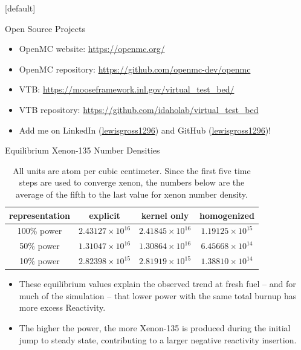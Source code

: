 \documentclass[9pt,t,aspectratio=169]{beamer}
\makeatletter
\newenvironment{withoutheadline}{
       \setbeamertemplate{headline}[default]
       \def\beamer@entrycode{\vspace*{-\headheight}}
    }{}
\makeatother
\begin{document}
\begin{withoutheadline}
    \LARGE
    \begin{frame}{Open Source Projects}
        \begin{itemize}
            \item OpenMC website: \href{https://openmc.org/}{https://openmc.org/}
            \item OpenMC repository: \href{https://github.com/openmc-dev/openmc}{https://github.com/openmc-dev/openmc}
            \item VTB: \href{https://mooseframework.inl.gov/virtual_test_bed/}{https://mooseframework.inl.gov/virtual\_test\_bed/}
            \item VTB repository: \href{https://github.com/idaholab/virtual_test_bed}{https://github.com/idaholab/virtual\_test\_bed}
            \item Add me on LinkedIn (\href{https://www.linkedin.com/in/lewisgross1296}{lewisgross1296}) and GitHub (\href{https://github.com/lewisgross1296}{lewisgross1296})!
        \end{itemize}
    \end{frame}
\end{withoutheadline}

\appendix

\begin{frame}{Equilibrium Xenon-135 Number Densities}
    \LARGE
    \begin{table}
        \centering
        \caption{All units are atom per cubic centimeter. Since the first five time steps are used to converge xenon, the numbers below are the average of the fifth to the last value for xenon number density.}
        \begin{tabular}{|c|c|c|c|} \hline
        representation & explicit & kernel only & homogenized \\ \hline
        100\% power & $2.43127\times 10^{16}$ & $2.41845\times 10^{16}$ & $1.19125\times 10^{15}$ \\  \hline
        50\% power & $1.31047\times 10^{16}$ & $1.30864\times 10^{16}$ & $6.45668\times 10^{14}$ \\ \hline
        10\% power & $2.82398\times 10^{15}$ & $2.81919\times 10^{15}$ & $1.38810\times 10^{14}$ \\ \hline
        \end{tabular}
        \label{tab:xenons}
    \end{table}
    \begin{itemize}
        \item These equilibrium values explain the observed trend at fresh fuel -- and for much of the simulation -- that lower power with the same total burnup has more excess Reactivity.
        \item The higher the power, the more Xenon-135 is produced during the initial jump to steady state, contributing to a larger negative reactivity insertion.
    \end{itemize}
\end{frame}
\end{document}

